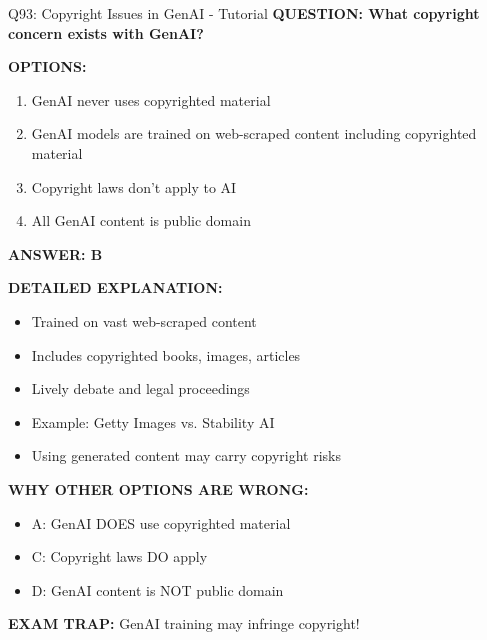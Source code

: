 \documentclass[8pt]{beamer}
\begin{document}
	\begin{frame}{Q93: Copyright Issues in GenAI - Tutorial}
		\fontsize{6.5}{7.5}\selectfont
		\textbf{QUESTION: What copyright concern exists with GenAI?}
		
		\vspace{0.1cm}
		\textbf{OPTIONS:}
		\begin{enumerate}
			\item GenAI never uses copyrighted material
			\item GenAI models are trained on web-scraped content including copyrighted material
			\item Copyright laws don't apply to AI
			\item All GenAI content is public domain
		\end{enumerate}
		
		\vspace{0.1cm}
		\textcolor{myblue}{\textbf{ANSWER: B}}
		
		\vspace{0.1cm}
		\textbf{DETAILED EXPLANATION:}
		\begin{itemize}
			\item Trained on vast web-scraped content
			\item Includes copyrighted books, images, articles
			\item Lively debate and legal proceedings
			\item Example: Getty Images vs. Stability AI
			\item Using generated content may carry copyright risks
		\end{itemize}
		
		\vspace{0.1cm}
		\textcolor{myred}{\textbf{WHY OTHER OPTIONS ARE WRONG:}}
		\begin{itemize}
			\item \textcolor{myred}{A:} GenAI DOES use copyrighted material
			\item \textcolor{myred}{C:} Copyright laws DO apply
			\item \textcolor{myred}{D:} GenAI content is NOT public domain
		\end{itemize}
		
		\textcolor{myred}{\textbf{EXAM TRAP:}} GenAI training may \textcolor{myblue}{infringe copyright}!
	\end{frame}
	
\end{document}
